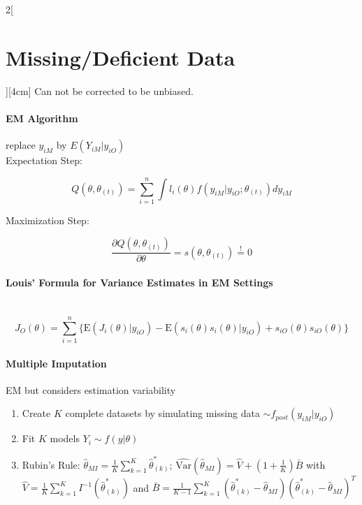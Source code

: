 \documentclass[8pt]{extarticle}
\begin{document}
\begin{multicols}{2}[\section{Missing/Deficient Data}][4cm]
\noindent Can not be corrected to be unbiased.

\paragraph{EM Algorithm} replace $y_{iM}$ by $E(Y_{iM}|y_{iO})$ \\

\noindent Expectation Step:

$$Q(\theta,\theta_{(t)}) = \sum_{i=1}^n\int l_i(\theta)f(y_{iM}|y_{iO};\theta_{(t)})dy_{iM}$$

\noindent Maximization Step:

$$\frac{\partial Q(\theta,\theta_{(t)})}{\partial \theta} = s(\theta,\theta_{(t)}) \overset{!}{=} 0 $$



\paragraph{Louis' Formula for Variance Estimates in EM Settings} \ \\

$$J_O(\theta) = \sum_{i=1}^n \{\mathrm{E}(J_i(\theta)|y_{iO}) - \mathrm{E}(s_i(\theta)s_i(\theta)|y_{iO}) + s_{iO}(\theta)s_{iO}(\theta)\}$$


 \paragraph{Multiple Imputation} EM but considers estimation variability
 
 \begin{enumerate}
 \item Create $K$ complete datasets by simulating missing data $\sim f_{post}(y_{iM}|y_{iO})$
 \item Fit $K$ models $Y_i \sim f(y|\theta)$
 \item Rubin's Rule: $\hat{\theta}_{MI} = \frac{1}{K}\sum_{k=1}^K \hat{\theta}^*_{(k)}$;
  $\widehat{\text{Var}}(\hat{\theta}_{MI}) = \hat{V} {+} (1{+}\frac{1}{K})\bar{B}$ 
 with $\hat{V} = \frac{1}{K} \sum_{k=1}^K I^{-1}(\hat{\theta}_{(k)}^*)$ 
 and $\bar{B} = \frac{1}{K-1} \sum_{k=1}^K (\hat{\theta}_{(k)}^* - \hat{\theta}_{MI}) (\hat{\theta}_{(k)}^* - \hat{\theta}_{MI})^T$
 \end{enumerate}
 

\end{multicols}
\end{document}

